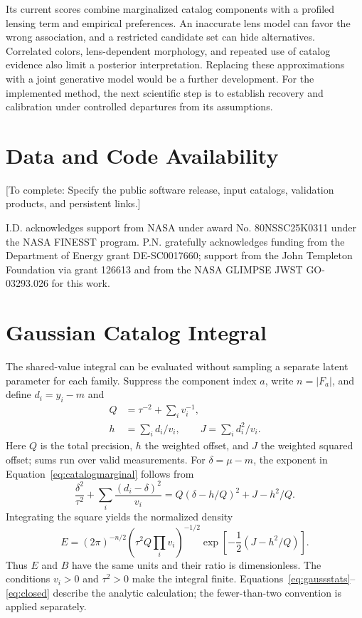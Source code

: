 \documentclass[twocolumn,twocolappendix,linenumbers]{aastex701}
\newcommand{\todo}[1]{\textcolor{red!65!black}{[To complete: #1]}}
\begin{document}
Its current scores combine marginalized catalog components with a profiled lensing term and empirical preferences.
An inaccurate lens model can favor the wrong association, and a restricted candidate set can hide alternatives.
Correlated colors, lens-dependent morphology, and repeated use of catalog evidence also limit a posterior interpretation.
Replacing these approximations with a joint generative model would be a further development.
For the implemented method, the next scientific step is to establish recovery and calibration under controlled departures from its assumptions.

\section*{Data and Code Availability}
\todo{Specify the public software release, input catalogs, validation products, and persistent links.}

\begin{acknowledgments}
I.D. acknowledges support from NASA under award No. 80NSSC25K0311 under the NASA FINESST program.
P.N. gratefully acknowledges funding from the Department of Energy grant DE-SC0017660; support from the John Templeton Foundation via grant 126613 and from the NASA GLIMPSE JWST GO-03293.026 for this work.
\end{acknowledgments}

\appendix
\section{Gaussian Catalog Integral}
\label{app:gaussian}
The shared-value integral can be evaluated without sampling a separate latent parameter for each family.
Suppress the component index $a$, write $n=|F_a|$, and define $d_i=y_i-m$ and
\begin{equation}
 \begin{aligned}
 Q&=\tau^{-2}+\sum_i v_i^{-1},\\
 h&=\sum_i d_i/v_i,\qquad J=\sum_i d_i^2/v_i.
 \end{aligned}
 \label{eq:gaussstats}
\end{equation}
Here $Q$ is the total precision, $h$ the weighted offset, and $J$ the weighted squared offset; sums run over valid measurements.
For $\delta=\mu-m$, the exponent in Equation~\ref{eq:catalogmarginal} follows from
\begin{equation}
 \frac{\delta^2}{\tau^2}+\sum_i\frac{(d_i-\delta)^2}{v_i}
 =Q(\delta-h/Q)^2+J-h^2/Q.
 \label{eq:complete}
\end{equation}
Integrating the square yields the normalized density
\begin{equation}
 E=(2\pi)^{-n/2}
       \left(\tau^2Q\prod_i v_i\right)^{-1/2}
       \exp\!\left[-\frac12(J-h^2/Q)\right].
 \label{eq:closed}
\end{equation}
Thus $E$ and $B$ have the same units and their ratio is dimensionless.
The conditions $v_i>0$ and $\tau^2>0$ make the integral finite.
Equations~\ref{eq:gaussstats}--\ref{eq:closed} describe the analytic calculation; the fewer-than-two convention is applied separately.
\end{document}
